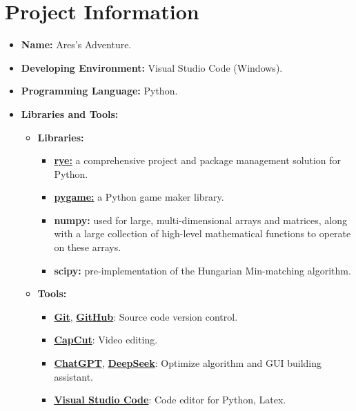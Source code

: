 \section{Project Information}
\begin{itemize}
  \item \textbf{Name:} Ares's Adventure.
  \item \textbf{Developing Environment:} Visual Studio Code (Windows).
  \item \textbf{Programming Language:} Python.
  \item \textbf{Libraries and Tools:}
        \begin{itemize}
          \item \textbf{Libraries:}
                \begin{itemize}
                  \item \href{https://rye.astral.sh/}{\textbf{rye:}} a comprehensive project and package management solution for Python.
                  \item \href{https://www.pygame.org/docs/}{\textbf{pygame:}} a Python game maker library.
                  \item \textbf{numpy:} used for large, multi-dimensional arrays and matrices, along with a large collection of high-level mathematical functions to operate on these arrays.
                  \item \textbf{scipy:} pre-implementation of the Hungarian Min-matching algorithm.
                \end{itemize}
          \item \textbf{Tools:}
                \begin{itemize}
                  \item \href{https://git-scm.com/}{\textbf{Git}}, \href{https://github.com/}{\textbf{GitHub}}: Source code version control.
                  \item \href{https://www.capcut.com/}{\textbf{CapCut}}: Video editing.
                  \item \href{https://chatgpt.com/}{\textbf{ChatGPT}}, \href{https://chat.deepseek.com/}{\textbf{DeepSeek}}: Optimize algorithm and GUI building assistant.
                  \item \href{https://code.visualstudio.com/}{\textbf{Visual Studio Code}}: Code editor for Python, Latex.
                \end{itemize}
        \end{itemize}
\end{itemize}
